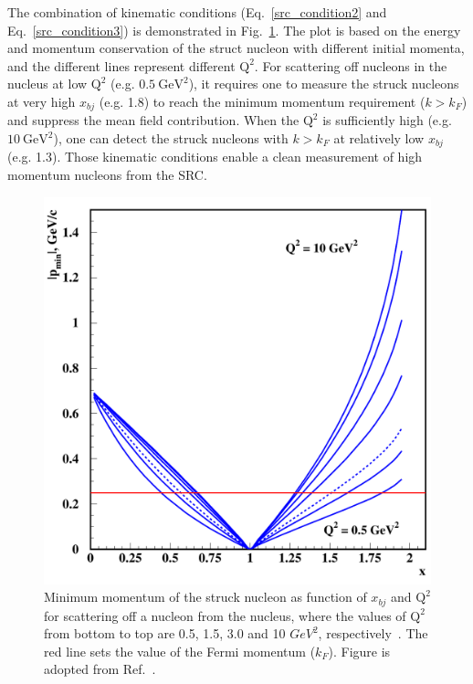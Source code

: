 The combination of kinematic conditions (Eq.~\eqref{src_condition2} and Eq.~\eqref{src_condition3}) is demonstrated in Fig.~\ref{kin_cond_q2_xbj}. The plot is based on the energy and momentum conservation of the struct nucleon with different initial momenta, and the different lines represent different $\mathrm{Q^{2}}$. For scattering off nucleons in the nucleus at low $\mathrm{Q^{2}}$ (e.g. $\mathrm{0.5~GeV^{2}}$), it requires one to measure the struck nucleons at very high $x_{bj}$ (e.g. 1.8) to reach the minimum momentum requirement ($k>k_{F}$) and suppress the mean field contribution. When the $\mathrm{Q^{2}}$ is sufficiently high (e.g. $\mathrm{10~GeV^{2}}$), one can detect the struck nucleons with $k>k_{F}$ at relatively low $x_{bj}$ (e.g. 1.3). Those kinematic conditions enable a clean measurement of high momentum nucleons from the SRC.
\begin{figure}[!ht]
  \begin{center}
    \includegraphics[type=pdf,ext=.pdf,read=.pdf,width=0.60\linewidth]{./figures/physics/kin_cond_q2_xbj}
    \caption[Minimum momentum of the struck nucleon as function of $x_{bj}$ and $\mathrm{Q^{2}}$]{\footnotesize{Minimum momentum of the struck nucleon as function of $x_{bj}$ and $\mathrm{Q^{2}}$ for scattering off a nucleon from the nucleus, where the values of $\mathrm{Q^{2}}$ from bottom to top are 0.5, 1.5, 3.0 and 10 $GeV^{2}$, respectively~\cite{Frankfurt_misak, src_john}. The red line sets the value of the Fermi momentum ($k_{F}$). Figure is adopted from Ref.~\cite{Frankfurt_misak}.}}
    \label{kin_cond_q2_xbj}
  \end{center}
\end{figure} 

